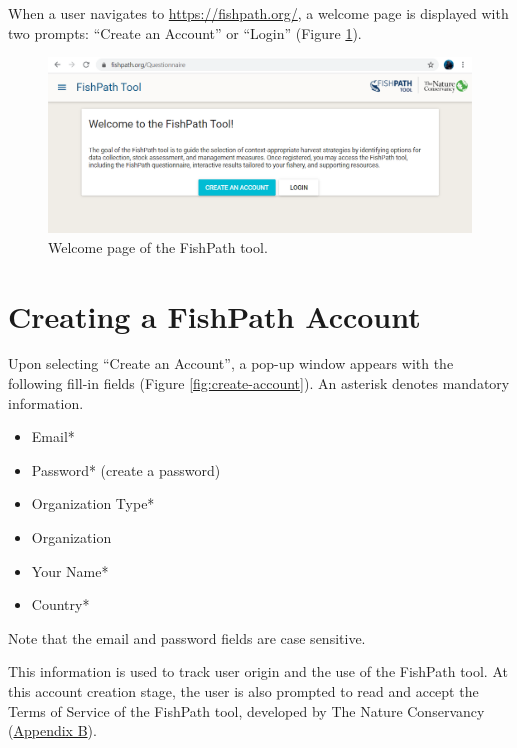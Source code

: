 \documentclass[11pt,]{book}
\providecommand{\tightlist}{%
  \setlength{\itemsep}{0pt}\setlength{\parskip}{0pt}}
\begin{document}
When a user navigates to \url{https://fishpath.org/}, a welcome page is displayed with two prompts: ``Create an Account'' or ``Login'' (Figure \ref{fig:welcome}).

\begin{figure}

{\centering \includegraphics[width=0.95\linewidth]{images/welcome-page} 

}

\caption{Welcome page of the FishPath tool.}\label{fig:welcome}
\end{figure}

\hypertarget{creating-a-fishpath-account}{%
\section{Creating a FishPath Account}\label{creating-a-fishpath-account}}

Upon selecting ``Create an Account'', a pop-up window appears with the following fill-in fields (Figure \ref{fig:create-account}). An asterisk denotes mandatory information.

\begin{itemize}
\tightlist
\item
  Email*
\item
  Password* (create a password)
\item
  Organization Type*
\item
  Organization
\item
  Your Name*
\item
  Country*
\end{itemize}

Note that the email and password fields are case sensitive.

This information is used to track user origin and the use of the FishPath tool. At this account creation stage, the user is also prompted to read and accept the Terms of Service of the FishPath tool, developed by The Nature Conservancy (\protect\hyperlink{terms}{Appendix B}).
\end{document}
